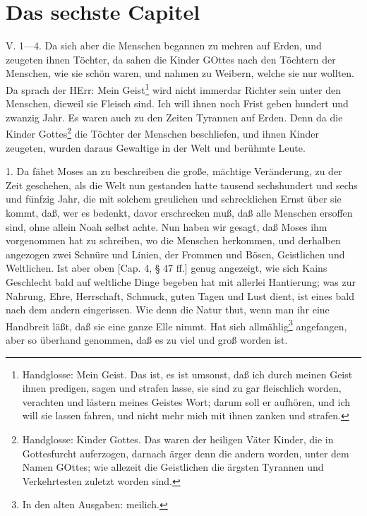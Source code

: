 \section{Das sechste Capitel}

\begin{schriftzitat}
V. 1—4. Da sich aber die Menschen begannen zu mehren auf Erden, und zeugeten ihnen Töchter, da sahen die Kinder GOttes nach den Töchtern der Menschen, wie sie schön waren, und nahmen zu Weibern, welche sie nur wollten. Da sprach der HErr: Mein Geist\footnote{Handglosse: Mein Geist. Das ist, es ist umsonst, daß ich durch meinen Geist ihnen predigen, sagen und strafen lasse, sie sind zu gar fleischlich worden, verachten und lästern meines Geistes Wort; darum soll er aufhören, und ich will sie lassen fahren, und nicht mehr mich mit ihnen zanken und strafen.} wird nicht immerdar Richter sein unter den Menschen, dieweil sie Fleisch sind. Ich will ihnen noch Frist geben hundert und zwanzig Jahr. Es waren auch zu den Zeiten Tyrannen auf Erden. Denn da die Kinder Gottes\footnote{Handglosse: Kinder Gottes. Das waren der heiligen Väter Kinder, die in Gottesfurcht auferzogen, darnach ärger denn die andern worden, unter dem Namen GOttes; wie allezeit die Geistlichen die ärgsten Tyrannen und Verkehrtesten zuletzt worden sind.} die Töchter der Menschen beschliefen, und ihnen Kinder zeugeten, wurden daraus Gewaltige in der Welt und berühmte Leute.
\end{schriftzitat}

1. Da fähet Moses an zu beschreiben die große, mächtige Veränderung, zu der Zeit geschehen, als die Welt nun gestanden hatte tausend sechshundert und sechs und fünfzig Jahr, die mit solchem greulichen und schrecklichen Ernst über sie kommt, daß, wer es bedenkt, davor erschrecken muß, daß alle Menschen ersoffen sind, ohne allein Noah selbst achte. Nun haben wir gesagt, daß Moses ihm vorgenommen hat zu schreiben, wo die Menschen herkommen, und derhalben angezogen zwei Schnüre und Linien, der Frommen und Bösen, Geistlichen und Weltlichen. Ist aber oben [Cap. 4, § 47 ff.] genug angezeigt, wie sich Kains Geschlecht bald auf weltliche Dinge begeben hat mit allerlei Hantierung; was zur Nahrung, Ehre, Herrschaft, Schmuck, guten Tagen und Lust dient, ist eines bald nach dem andern eingerissen. Wie denn die Natur thut, wenn man ihr eine Handbreit läßt, daß sie eine ganze Elle nimmt. Hat sich allmählig\footnote{In den alten Ausgaben: meilich.} angefangen, aber so überhand genommen, daß es zu viel und groß worden ist.

